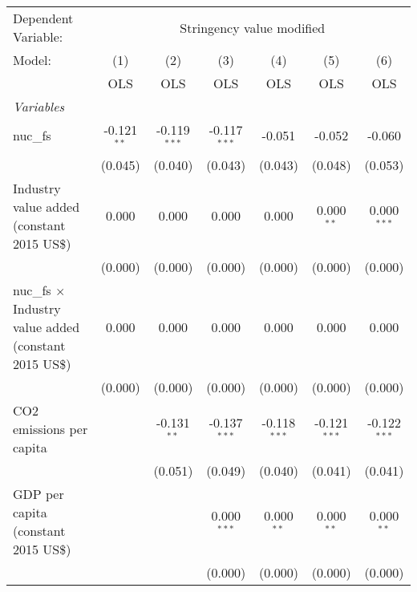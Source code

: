 
\begingroup
\centering
\begin{tabular}{lcccccc}
   \toprule
   Dependent Variable: & \multicolumn{6}{c}{Stringency value modified}\\
   Model:                                                        & (1)           & (2)            & (3)            & (4)            & (5)            & (6)\\  
                                                                 &  OLS          & OLS            & OLS            & OLS            & OLS            & OLS\\  
   \midrule
   \emph{Variables}\\
   nuc\_fs                                                       & -0.121$^{**}$ & -0.119$^{***}$ & -0.117$^{***}$ & -0.051         & -0.052         & -0.060\\   
                                                                 & (0.045)       & (0.040)        & (0.043)        & (0.043)        & (0.048)        & (0.053)\\   
   Industry value added (constant 2015 US\$)                     & 0.000         & 0.000          & 0.000          & 0.000          & 0.000$^{**}$   & 0.000$^{***}$\\   
                                                                 & (0.000)       & (0.000)        & (0.000)        & (0.000)        & (0.000)        & (0.000)\\   
   nuc\_fs $\times$ Industry value added (constant 2015 US\$)    & 0.000         & 0.000          & 0.000          & 0.000          & 0.000          & 0.000\\   
                                                                 & (0.000)       & (0.000)        & (0.000)        & (0.000)        & (0.000)        & (0.000)\\   
   CO2 emissions per capita                                      &               & -0.131$^{**}$  & -0.137$^{***}$ & -0.118$^{***}$ & -0.121$^{***}$ & -0.122$^{***}$\\   
                                                                 &               & (0.051)        & (0.049)        & (0.040)        & (0.041)        & (0.041)\\   
   GDP per capita (constant 2015 US\$)                           &               &                & 0.000$^{***}$  & 0.000$^{**}$   & 0.000$^{**}$   & 0.000$^{**}$\\   
                                                                 &               &                & (0.000)        & (0.000)        & (0.000)        & (0.000)\\   

\end{tabular}
